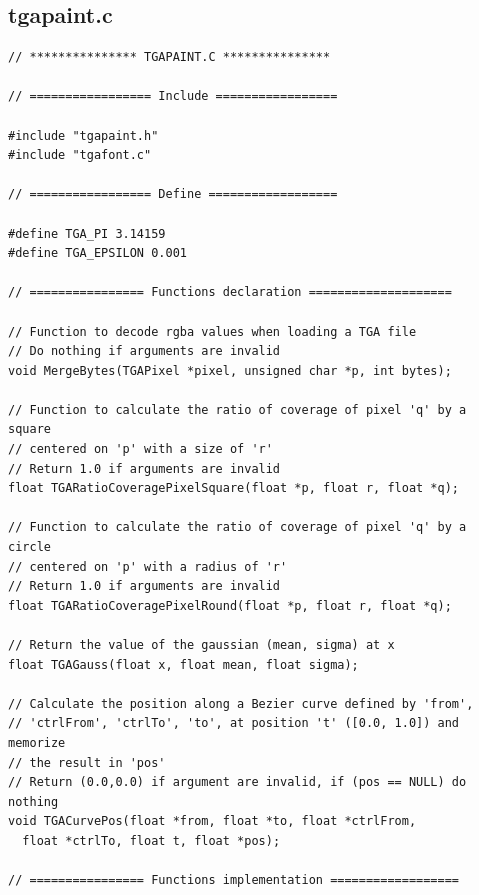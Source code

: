 \documentclass[12pt, a4paper]{article}
\begin{document}
\subsection{tgapaint.c}

\begin{scriptsize}
\begin{ttfamily}
\begin{lstlisting}
// *************** TGAPAINT.C ***************

// ================= Include =================

#include "tgapaint.h"
#include "tgafont.c"

// ================= Define ==================

#define TGA_PI 3.14159
#define TGA_EPSILON 0.001

// ================ Functions declaration ====================

// Function to decode rgba values when loading a TGA file
// Do nothing if arguments are invalid
void MergeBytes(TGAPixel *pixel, unsigned char *p, int bytes);

// Function to calculate the ratio of coverage of pixel 'q' by a square
// centered on 'p' with a size of 'r'
// Return 1.0 if arguments are invalid
float TGARatioCoveragePixelSquare(float *p, float r, float *q);

// Function to calculate the ratio of coverage of pixel 'q' by a circle
// centered on 'p' with a radius of 'r'
// Return 1.0 if arguments are invalid
float TGARatioCoveragePixelRound(float *p, float r, float *q);

// Return the value of the gaussian (mean, sigma) at x
float TGAGauss(float x, float mean, float sigma);

// Calculate the position along a Bezier curve defined by 'from',
// 'ctrlFrom', 'ctrlTo', 'to', at position 't' ([0.0, 1.0]) and memorize
// the result in 'pos'
// Return (0.0,0.0) if argument are invalid, if (pos == NULL) do nothing
void TGACurvePos(float *from, float *to, float *ctrlFrom, 
  float *ctrlTo, float t, float *pos);

// ================ Functions implementation ==================


\end{lstlisting}
\end{ttfamily}
\end{scriptsize}
\end{document}
